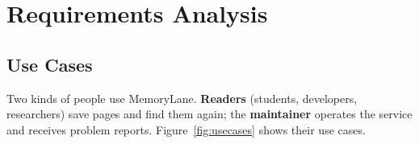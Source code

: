 
\chapter{Requirements Analysis}
\label{ch:requirements}

\section{Use Cases}

Two kinds of people use MemoryLane. \textbf{Readers} (students, developers,
researchers) save pages and find them again; the \textbf{maintainer} operates
the service and receives problem reports. Figure~\ref{fig:usecases} shows
their use cases.

